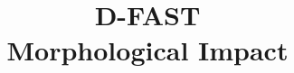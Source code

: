 \documentclass{deltares_manual}
\begin{document}
\title{D-FAST\\ Morphological Impact}
\subtitle{}

\author{ }

\deltarestitle
%









\appendix


\end{document}
